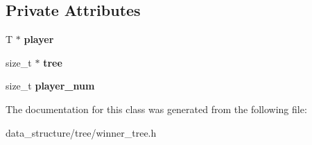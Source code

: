 \subsection*{Private Attributes}
\begin{DoxyCompactItemize}
\item 
\mbox{\label{classCompleteWinnerTree_adc3e56f07e19d3e82bcc838e7ff19ee6}} 
T $\ast$ {\bfseries player}
\item 
\mbox{\label{classCompleteWinnerTree_a2d98d5cf839969d302e234b3476b6657}} 
size\+\_\+t $\ast$ {\bfseries tree}
\item 
\mbox{\label{classCompleteWinnerTree_a2f955e8e6a28e10047ab0c0bc9130d5d}} 
size\+\_\+t {\bfseries player\+\_\+num}
\end{DoxyCompactItemize}


The documentation for this class was generated from the following file\+:\begin{DoxyCompactItemize}
\item 
data\+\_\+structure/tree/winner\+\_\+tree.\+h\end{DoxyCompactItemize}
